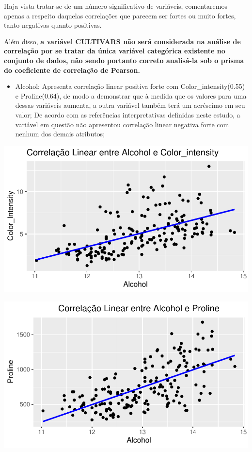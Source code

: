 \documentclass[
  letterpaper,
  DIV=11,
  numbers=noendperiod]{scrartcl}
\providecommand{\tightlist}{%
  \setlength{\itemsep}{0pt}\setlength{\parskip}{0pt}}\usepackage{longtable,booktabs,array}
\begin{document}
Haja vista tratar-se de um número significativo de variáveis,
comentaremos apenas a respeito daquelas correlações que parecem ser
fortes ou muito fortes, tanto negativas quanto positivas.

Além disso, \textbf{a variável CULTIVARS não será considerada na análise
de correlação por se tratar da única variável categórica existente no
conjunto de dados, não sendo portanto correto analisá-la sob o prisma do
coeficiente de correlação de Pearson.}

\begin{itemize}
\tightlist
\item
  Alcohol: Apresenta correlação linear positiva forte com
  Color\_intensity(0.55) e Proline(0.64), de modo a demonstrar que à
  medida que os valores para uma dessas variáveis aumenta, a outra
  variável também terá um acréscimo em seu valor; De acordo com as
  referências interpretativas definidas neste estudo, a variável em
  questão não apresentou correlação linear negativa forte com nenhum dos
  demais atributos;
\end{itemize}

\begin{center}
\includegraphics{wines_analysis_files/figure-pdf/unnamed-chunk-8-1.pdf}
\end{center}

\begin{center}
\includegraphics{wines_analysis_files/figure-pdf/unnamed-chunk-8-2.pdf}
\end{center}
\end{document}
